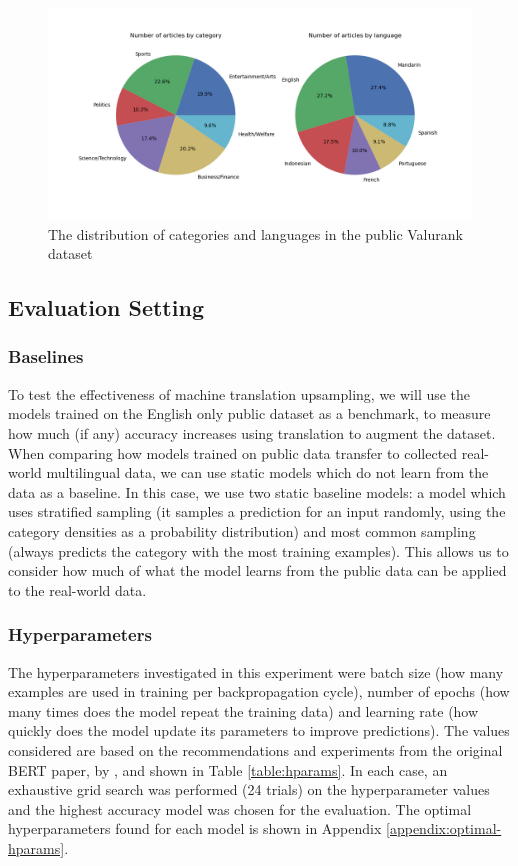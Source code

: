\documentclass{l4proj}
\begin{document}
\begin{figure}[h]
\includegraphics[width=\textwidth]{images/real_data_distributions.png}
\caption{The distribution of categories and languages in the public Valurank dataset}
\label{fig:collected-distributions}
\end{figure}

\subsection{Evaluation Setting}
\subsubsection{Baselines} \hfill \par
To test the effectiveness of machine translation upsampling, we will use the models trained on the English only public dataset as a benchmark, to measure how much (if any) accuracy increases using translation to augment the dataset. When comparing how models trained on public data transfer to collected real-world multilingual data, we can use static models which do not learn from the data as a baseline. In this case, we use two static baseline models: a model which uses stratified sampling (it samples a prediction for an input randomly, using the category densities as a probability distribution) and most common sampling (always predicts the category with the most training examples). This allows us to consider how much of what the model learns from the public data can be applied to the real-world data.

\subsubsection{Hyperparameters} \hfill \par
The hyperparameters investigated in this experiment were batch size (how many examples are used in training per backpropagation cycle), number of epochs (how many times does the model repeat the training data) and learning rate (how quickly does the model update its parameters to improve predictions). The values considered are based on the recommendations and experiments from the original BERT paper, by \cite{devlin2018bert}, and shown in Table \ref{table:hparams}. In each case, an exhaustive grid search was performed (24 trials) on the hyperparameter values and the highest accuracy model was chosen for the evaluation. The optimal hyperparameters found for each model is shown in Appendix \ref{appendix:optimal-hparams}.
\end{document}
